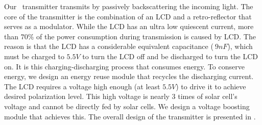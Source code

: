 Our \vitag\ transmitter transmits by passively backscattering the incoming light. The core of the transmitter is the combination of an LCD and a retro-reflector that serves as a modulator. %
While the LCD has an ultra low quiescent current, more than $70\%$ of the power consumption during transmission is caused by LCD. The reason is that the LCD has a considerable equivalent capacitance ($~9nF$), which must be charged to $5.5V$ to turn the LCD off and be discharged to turn the LCD on. It is this charging-discharging process that consumes energy. To conserve energy, we design an energy reuse module that recycles the discharging current. 
The LCD requires a voltage high enough (\eg at least $5.5V$) to drive it to achieve desired polarization level. This high voltage is nearly 3 times of solar cell's voltage and cannot be directly fed by solar cells. We design a voltage boosting module that achieves this. The overall design of the \vitag transmitter is presented in . 



